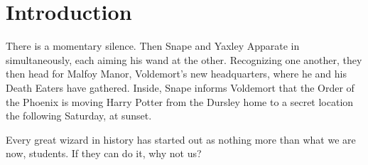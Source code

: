 \chapter{Introduction}
\label{chap:intro}
There is a momentary silence. Then Snape and Yaxley Apparate in simultaneously, each aiming his wand at the other. Recognizing one another, they then head for Malfoy Manor, Voldemort's new headquarters\cite{small}, where he and his Death Eaters have gathered. Inside, Snape informs Voldemort that the Order of the Phoenix is moving Harry Potter from the Dursley home to a secret location the following Saturday, at sunset.

\begin{ntuquote}%
Every great wizard in history has started out as nothing more than what we are now, students. If they can do it, why not us?%
\end{ntuquote}

